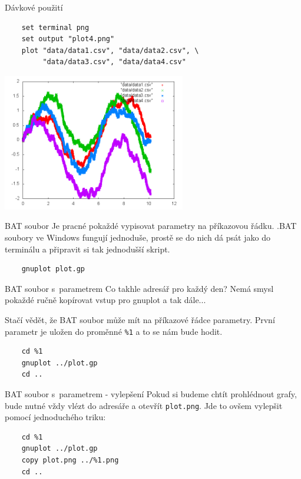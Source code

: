 \documentclass{beamer}
\begin{document}
\begin{frame}[fragile]{Dávkové použití}
  \scriptsize
  \begin{verbatim}
    set terminal png
    set output "plot4.png"
    plot "data/data1.csv", "data/data2.csv", \
         "data/data3.csv", "data/data4.csv"
  \end{verbatim}
  \pause
  \begin{center}
    \includegraphics[width=0.6\textwidth]{../gnuplot/plot4}
  \end{center}
\end{frame}

\begin{frame}[fragile]{BAT soubor}
  Je pracné pokaždé vypisovat parametry na příkazovou řádku. .BAT soubory ve Windows fungují jednoduše, prostě se do nich dá psát jako do terminálu a připravit si tak jednodušší skript.
  \begin{verbatim}
    gnuplot plot.gp
  \end{verbatim}
\end{frame}

\begin{frame}[fragile]{BAT soubor s~parametrem}
  Co takhle adresář pro každý den? Nemá smysl pokaždé ručně kopírovat vstup pro gnuplot a tak dále...

  Stačí vědět, že BAT soubor může mít na příkazové řádce parametry. První parametr je uložen do proměnné \texttt{\%1} a to se nám bude hodit.

  \begin{verbatim}
    cd %1
    gnuplot ../plot.gp
    cd ..
  \end{verbatim}
\end{frame}

\begin{frame}[fragile]{BAT soubor s~parametrem - vylepšení}
  Pokud si budeme chtít prohlédnout grafy, bude nutné vždy vlézt do adresáře a otevřít \texttt{plot.png}. Jde to ovšem vylepšit pomocí jednoduchého triku:

  \begin{verbatim}
    cd %1
    gnuplot ../plot.gp
    copy plot.png ../%1.png
    cd ..
  \end{verbatim}
\end{frame}
\end{document}
